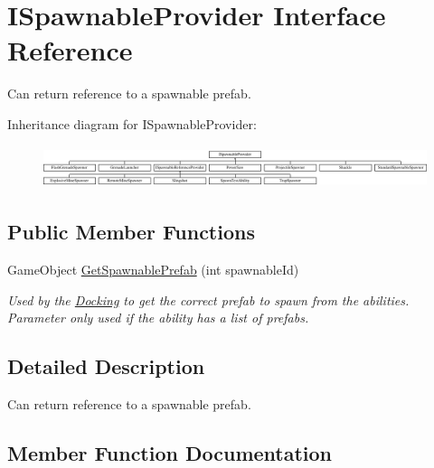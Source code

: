 \hypertarget{interface_i_spawnable_provider}{}\section{I\+Spawnable\+Provider Interface Reference}
\label{interface_i_spawnable_provider}


Can return reference to a spawnable prefab.  


Inheritance diagram for I\+Spawnable\+Provider\+:\begin{figure}[H]
\begin{center}
\leavevmode
\includegraphics[height=1.243523cm]{interface_i_spawnable_provider}
\end{center}
\end{figure}
\subsection*{Public Member Functions}
\begin{DoxyCompactItemize}
\item 
Game\+Object \hyperlink{interface_i_spawnable_provider_a42e8d986066b6c2e736e1f909f422dc9}{Get\+Spawnable\+Prefab} (int spawnable\+Id)
\begin{DoxyCompactList}\small\item\em Used by the \hyperlink{class_docking}{Docking} to get the correct prefab to spawn from the abilities. Parameter only used if the ability has a list of prefabs. \end{DoxyCompactList}\end{DoxyCompactItemize}


\subsection{Detailed Description}
Can return reference to a spawnable prefab. 



\subsection{Member Function Documentation}
\hypertarget{interface_i_spawnable_provider_a42e8d986066b6c2e736e1f909f422dc9}{}\label{interface_i_spawnable_provider_a42e8d986066b6c2e736e1f909f422dc9} 
